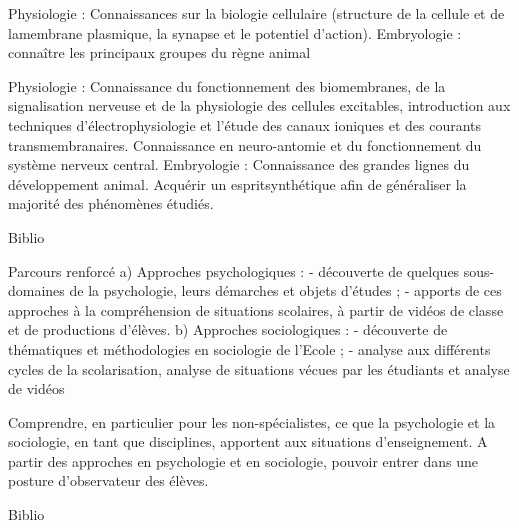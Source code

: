 \documentclass[10pt, a5paper]{report}
\begin{document}
{ Physiologie : Connaissances sur la biologie cellulaire (structure de la cellule et de lamembrane plasmique, la synapse et le potentiel d’action). Embryologie : connaître les principaux groupes du règne animal
} 
{\begin{itemize} 
  \ObjItem Physiologie : Connaissance du fonctionnement des biomembranes, de la signalisation nerveuse et de la physiologie des cellules excitables, introduction aux techniques d’électrophysiologie et l’étude des canaux ioniques et des courants transmembranaires. Connaissance en neuro-antomie et du fonctionnement du système nerveux central.
\ObjItem Embryologie : Connaissance des grandes lignes du développement animal. Acquérir un espritsynthétique afin de généraliser la majorité des phénomènes étudiés.
\end{itemize} 
} 
{} 
{Biblio}
 
\vfill
\module[codeApogee={UEL},
titre={Approches psychologiques et sociologiques pour l'enseignement}, 
COURS={}, 
TD={20}, 
TP={}, 
CTD={},
CTP={}, 
TOTAL={20}, 
SEMESTRE={Semestre 5}, 
COEFF={}, 
ECTS={}, 
ModalitesCCSemestreUn={Cf. modalités de contrôle de connaissances des UE Libres}, 
ModalitesCCSemestreDeux={Cf. modalités de contrôle de connaissances des UE Libres}, 
NoteEliminatoire={}, 
nomPremierResp={Anne-Lise Doyen}, 
emailPremierResp={anne-lise.doyen@univ-orleans.fr}, 
nomSecondResp={}, 
emailSecondResp={}, 
langue={Français}, 
nbPrerequis={0}, 
descriptionCourte={true}, 
descriptionLongue={true}, 
objectifs={true}, 
ressources={true}, 
bibliographie={false}] 
{Parcours renforcé
} 
{
a) Approches psychologiques :
- découverte de quelques sous-domaines de la psychologie, leurs démarches et objets d'études ;
- apports de ces approches à la compréhension de situations scolaires, à partir de vidéos de classe et de productions d'élèves.
b) Approches sociologiques :
- découverte de thématiques et méthodologies en sociologie de l'Ecole ;
- analyse aux différents cycles de la scolarisation, analyse de situations vécues par les étudiants et analyse de vidéos} 
{
} 
{\begin{itemize} 
  \ObjItem Comprendre, en particulier pour les non-spécialistes, ce que la psychologie et la sociologie, en tant que disciplines, apportent aux situations d'enseignement.
\ObjItem A partir des approches en psychologie et en sociologie, pouvoir entrer dans une posture d'observateur des élèves.
\end{itemize} 
} 
{} 
{Biblio}
 
\end{document}
